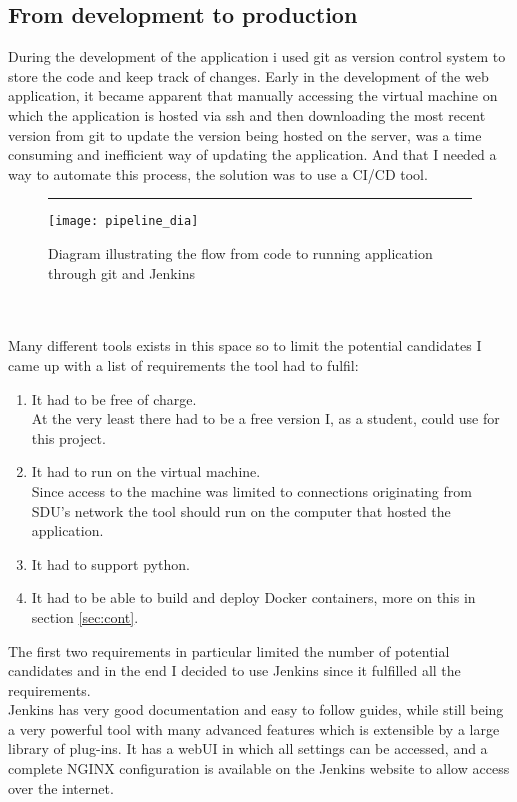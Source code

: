 \subsection{From development to production} \label{sec:dev_to_prod}
During the development of the application i used git as version control system to store the code and keep track of changes. Early in the development of the web application, it became apparent that manually accessing the virtual machine on which the application is hosted via ssh and then downloading the most recent version from git to update the version being hosted on the server, was a time consuming and inefficient way of updating the application. And that I needed a way to automate this process, the solution was to use a CI/CD tool\cite{redhat_cicd}.
\begin{figure}[b]
\centering
\hrule
\vspace*{0.2cm}
\texttt{[image: pipeline\_dia]}
\caption{Diagram illustrating the flow from code to running application through git and Jenkins}
\label{fig:pipe}
\end{figure}
\\\\
Many different tools exists in this space so to limit the potential candidates I came up with a list of requirements the tool had to fulfil:
\begin{enumerate}
	\item It had to be free of charge.\\At the very least there had to be a free version I, as a student, could use for this project.
	\item It had to run on the virtual machine.\\Since access to the machine was limited to connections originating from SDU's network the tool should run on the computer that hosted the application.
	\item It had to support python.
	\item It had to be able to build and deploy Docker containers, more on this in section \ref{sec:cont}.
\end{enumerate}
The first two requirements in particular limited the number of potential candidates and in the end I decided to use Jenkins since it fulfilled all the requirements.\\
Jenkins has very good documentation and easy to follow guides, while still being a very powerful tool with many advanced features which is extensible by a large library of plug-ins. It has a webUI in which all settings can be accessed, and a complete NGINX configuration is available on the Jenkins website\cite{jenkins_nginx} to allow access over the internet.\\\\
